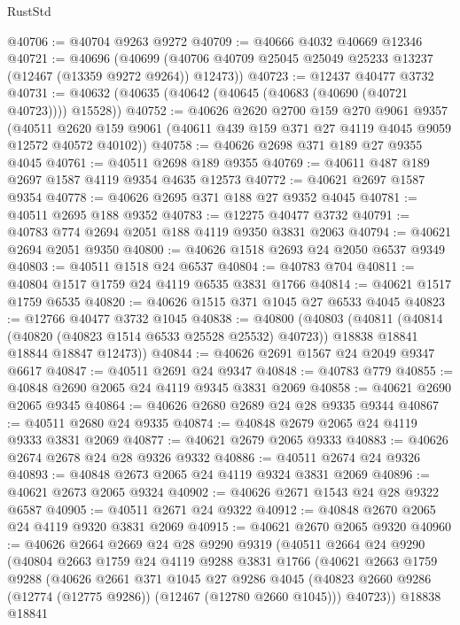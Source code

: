 \begin{lexlean}{RustStd}
\begin{coremodule}
@40706 := @40704 @9263 @9272
@40709 := @40666 @4032 @40669 @12346
@40721 := @40696
    (@40699 (@40706 @40709 @25045 @25049 @25233 @13237 (@12467 (@13359 @9272 @9264)) @12473))
@40723 := @12437 @40477 @3732
@40731 := @40632 (@40635 (@40642 (@40645 (@40683 (@40690 (@40721 @40723)))) @15528))
@40752 := @40626
    @2620
    @2700
    @159
    @270
    @9061
    @9357
    (@40511 @2620 @159 @9061 (@40611 @439 @159 @371 @27 @4119 @4045 @9059 @12572 @40572 @40102))
@40758 := @40626 @2698 @371 @189 @27 @9355 @4045
@40761 := @40511 @2698 @189 @9355
@40769 := @40611 @487 @189 @2697 @1587 @4119 @9354 @4635 @12573
@40772 := @40621 @2697 @1587 @9354
@40778 := @40626 @2695 @371 @188 @27 @9352 @4045
@40781 := @40511 @2695 @188 @9352
@40783 := @12275 @40477 @3732
@40791 := @40783 @774 @2694 @2051 @188 @4119 @9350 @3831 @2063
@40794 := @40621 @2694 @2051 @9350
@40800 := @40626 @1518 @2693 @24 @2050 @6537 @9349
@40803 := @40511 @1518 @24 @6537
@40804 := @40783 @704
@40811 := @40804 @1517 @1759 @24 @4119 @6535 @3831 @1766
@40814 := @40621 @1517 @1759 @6535
@40820 := @40626 @1515 @371 @1045 @27 @6533 @4045
@40823 := @12766 @40477 @3732 @1045
@40838 := @40800
    (@40803
      (@40811
        (@40814 (@40820 (@40823 @1514 @6533 @25528 @25532) @40723))
        @18838
        @18841
        @18844
        @18847
        @12473))
@40844 := @40626 @2691 @1567 @24 @2049 @9347 @6617
@40847 := @40511 @2691 @24 @9347
@40848 := @40783 @779
@40855 := @40848 @2690 @2065 @24 @4119 @9345 @3831 @2069
@40858 := @40621 @2690 @2065 @9345
@40864 := @40626 @2680 @2689 @24 @28 @9335 @9344
@40867 := @40511 @2680 @24 @9335
@40874 := @40848 @2679 @2065 @24 @4119 @9333 @3831 @2069
@40877 := @40621 @2679 @2065 @9333
@40883 := @40626 @2674 @2678 @24 @28 @9326 @9332
@40886 := @40511 @2674 @24 @9326
@40893 := @40848 @2673 @2065 @24 @4119 @9324 @3831 @2069
@40896 := @40621 @2673 @2065 @9324
@40902 := @40626 @2671 @1543 @24 @28 @9322 @6587
@40905 := @40511 @2671 @24 @9322
@40912 := @40848 @2670 @2065 @24 @4119 @9320 @3831 @2069
@40915 := @40621 @2670 @2065 @9320
@40960 := @40626
    @2664
    @2669
    @24
    @28
    @9290
    @9319
    (@40511
      @2664
      @24
      @9290
      (@40804
        @2663
        @1759
        @24
        @4119
        @9288
        @3831
        @1766
        (@40621
          @2663
          @1759
          @9288
          (@40626
            @2661
            @371
            @1045
            @27
            @9286
            @4045
            (@40823 @2660 @9286 (@12774 (@12775 @9286)) (@12467 (@12780 @2660 @1045)))
            @40723))
        @18838
        @18841

\end{coremodule}
\end{lexlean}
